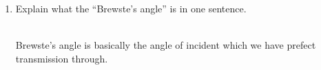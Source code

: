 \documentclass[fleqn]{article}
\begin{document}
\begin{enumerate}
\begin{enumerate}
      \item Explain what the “Brewste's angle” is in one sentence.

        \textcolor{hwColor}{
          \\
          Brewste's angle is basically the angle of incident which we have prefect transmission through. 
        }
      
    \end{enumerate}

  \end{enumerate}
\end{document}
